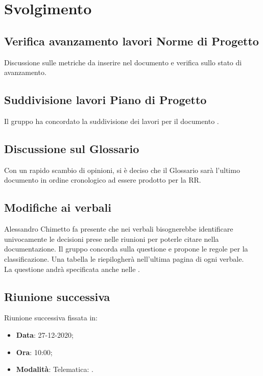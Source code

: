 \documentclass[]{article}
\begin{document}
	\newpage

	\section{Svolgimento}
		\subsection{Verifica avanzamento lavori Norme di Progetto}
		Discussione sulle metriche da inserire nel documento e verifica sullo stato di avanzamento.\\

		\subsection{Suddivisione lavori Piano di Progetto}
		Il gruppo ha concordato la suddivisione dei lavori per il documento .\\

		\subsection{Discussione sul Glossario}
		Con un rapido scambio di opinioni, si è deciso che il Glossario sarà l'ultimo documento in ordine cronologico ad essere prodotto per la RR.\\

		\subsection{Modifiche ai verbali}
		Alessandro Chimetto fa presente che nei verbali bisognerebbe identificare univocamente le decisioni prese nelle riunioni per poterle citare nella documentazione. Il gruppo concorda sulla questione e propone le regole per la classificazione. Una tabella le riepilogherà nell'ultima pagina di ogni verbale.\\
		La questione andrà specificata anche nelle .

		\subsection{Riunione successiva}
		Riunione successiva fissata in:
		\begin{itemize}
			\item \textbf{Data}: 27-12-2020;
			\item \textbf{Ora}: 10:00;
			\item \textbf{Modalità}: Telematica: .
		\end{itemize}
	
\end{document}
